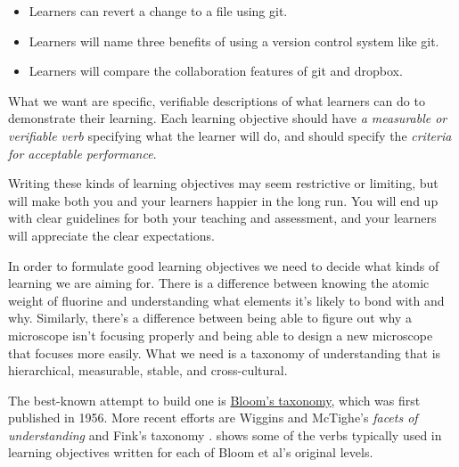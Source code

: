 \begin{itemize}
\item
  Learners can revert a change to a file using git.
\item
  Learners will name three benefits of using a version control system
  like git.
\item
  Learners will compare the collaboration features of git and dropbox.
\end{itemize}

What we want are specific, verifiable descriptions of what learners can
do to demonstrate their learning. Each learning objective should have
\emph{a measurable or verifiable verb} specifying what the learner will
do, and should specify the \emph{criteria for acceptable performance}.

Writing these kinds of learning objectives may seem restrictive or
limiting, but will make both you and your learners happier in the long
run. You will end up with clear guidelines for both your teaching and
assessment, and your learners will appreciate the clear expectations.

In order to formulate good learning objectives we need to decide what
kinds of learning we are aiming for. There is a difference between
knowing the atomic weight of fluorine and understanding what elements
it's likely to bond with and why. Similarly, there's a difference
between being able to figure out why a microscope isn't focusing
properly and being able to design a new microscope that focuses more
easily. What we need is a taxonomy of understanding that is
hierarchical, measurable, stable, and cross-cultural.

The best-known attempt to build one is
\href{https://en.wikipedia.org/wiki/Bloom's\_taxonomy}{Bloom's taxonomy},
which was first published in 1956. More recent efforts are Wiggins and
McTighe's \emph{facets of understanding} \cite{bib:wiggins-mctighe} and Fink's taxonomy
\cite{bib:fink-csle}. 
shows some of the verbs typically used in learning objectives written
for each of Bloom et al's original levels.

